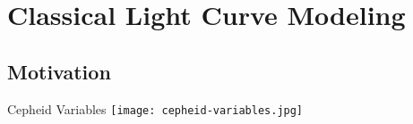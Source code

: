 \documentclass[serif,mathserif,professionalfont]{beamer}
\begin{document}

\section{Classical Light Curve Modeling}

\subsection{Motivation}
\begin{frame}{Cepheid Variables}
\texttt{[image: cepheid-variables.jpg]}
\end{frame}
\end{document}
